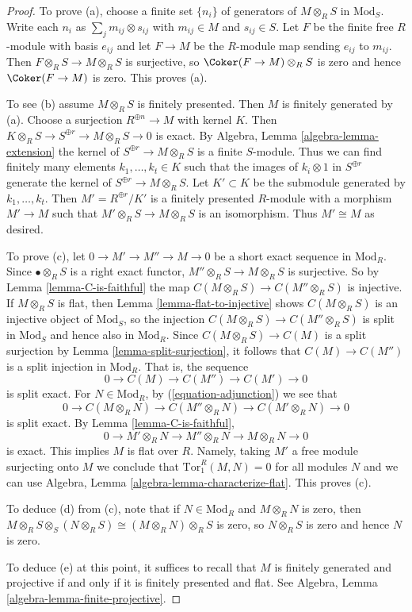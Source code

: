 \begin{proof}
To prove (a), choose a finite set $\{n_i\}$ of generators of $M \otimes_R S$
in $\text{Mod}_S$. Write each $n_i$ as $\sum_j m_{ij} \otimes s_{ij}$ with
$m_{ij} \in M$ and $s_{ij} \in S$. Let $F$ be the finite free $R$-module with
basis $e_{ij}$ and let $F \to M$ be the $R$-module map sending $e_{ij}$ to
$m_{ij}$. Then $F \otimes_R S\to M \otimes_R S$ is surjective, so
$\Coker(F \to M) \otimes_R S$ is zero and hence $\Coker(F \to M)$
is zero. This proves (a).

\medskip\noindent
To see (b) assume $M \otimes_R S$ is finitely presented. Then $M$ is finitely
generated by (a). Choose a surjection $R^{\oplus n} \to M$ with kernel $K$.
Then $K \otimes_R S \to S^{\oplus r} \to M \otimes_R S \to 0$ is exact.
By Algebra, Lemma \ref{algebra-lemma-extension}
the kernel of $S^{\oplus r} \to M \otimes_R S$
is a finite $S$-module. Thus we can find finitely many elements
$k_1, \ldots, k_t \in K$ such that the images of $k_i \otimes 1$ in
$S^{\oplus r}$ generate the kernel of $S^{\oplus r} \to M \otimes_R S$.
Let $K' \subset K$ be the submodule generated by $k_1, \ldots, k_t$.
Then $M' = R^{\oplus r}/K'$ is a finitely presented $R$-module
with a morphism $M' \to M$ such that $M' \otimes_R S \to M \otimes_R S$
is an isomorphism. Thus $M' \cong M$ as desired.

\medskip\noindent
To prove (c), let $0 \to M' \to M'' \to M \to 0$ be a short exact sequence in 
$\text{Mod}_R$. Since $\bullet \otimes_R S$ is a right exact functor,
$M'' \otimes_R S \to M \otimes_R S$ is surjective. So by
Lemma \ref{lemma-C-is-faithful} the map
$C(M \otimes_R S) \to C(M'' \otimes_R S)$ is injective.
If $M \otimes_R S$ is flat, then
Lemma \ref{lemma-flat-to-injective} shows
$C(M \otimes_R S)$ is an injective object of $\text{Mod}_S$, so the injection
$C(M \otimes_R S) \to C(M'' \otimes_R S)$
is split in $\text{Mod}_S$ and hence also in $\text{Mod}_R$.
Since $C(M \otimes_R S) \to C(M)$ is a split surjection by 
Lemma \ref{lemma-split-surjection}, it follows that 
$C(M) \to C(M'')$ is a split injection in $\text{Mod}_R$. That is, the sequence
$$
0 \to C(M) \to C(M'') \to C(M') \to 0
$$
is split exact. 
For $N \in \text{Mod}_R$, by (\ref{equation-adjunction}) we see that 
$$
0 \to C(M \otimes_R N) \to C(M'' \otimes_R N) \to C(M' \otimes_R N) \to 0
$$
is split exact. By Lemma \ref{lemma-C-is-faithful}, 
$$
0 \to M' \otimes_R N \to M'' \otimes_R N \to M \otimes_R N \to 0
$$
is exact. This implies $M$ is flat over $R$. Namely, taking
$M'$ a free module surjecting onto $M$ we conclude that
$\text{Tor}_1^R(M, N) = 0$ for all modules $N$ and we can use
Algebra, Lemma \ref{algebra-lemma-characterize-flat}.
This proves (c).

\medskip\noindent
To deduce (d) from (c), note that if $N \in \text{Mod}_R$ and $M \otimes_R N$ 
is zero,
then $M \otimes_R S \otimes_S (N \otimes_R S) \cong (M \otimes_R N) \otimes_R 
S$ is zero,
so $N \otimes_R S$ is zero and hence $N$ is zero.

\medskip\noindent
To deduce (e) at this point, it suffices to recall that $M$ is finitely 
generated and projective if and only if it is finitely presented and flat.
See Algebra, Lemma \ref{algebra-lemma-finite-projective}.
\end{proof}

